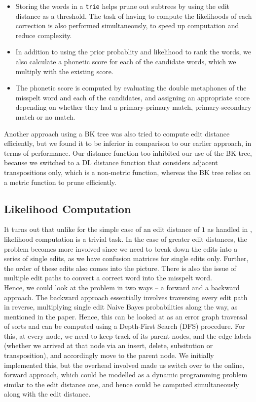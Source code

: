 \begin{itemize}
\item Storing the words in a \texttt{trie} helps prune out subtrees by using the edit distance as a threshold. The task of having to compute the likelihoods of each correction is also performed simultaneously, to speed up computation and reduce complexity.

\item In addition to using the prior probablity and likelihood to rank the words, we also calculate a phonetic score for each of the candidate words, which we multiply with the existing score.

\item The phonetic score is computed by evaluating the double metaphones of the misspelt word and each of the candidates, and assigning an appropriate score depending on whether they had a primary-primary match, primary-secondary match or no match.
\end{itemize}

Another approach using a BK tree was also tried to compute edit distance efficiently, but we found it to be inferior in comparison to our earlier approach, in terms of performance. Our distance function too inhibited our use of the BK tree, because we switched to a DL distance function that considers adjacent transpositions only, which is a non-metric function, whereas the BK tree relies on a metric function to prune efficiently.

\subsection{Likelihood Computation}
It turns out that unlike for the simple case of an edit distance of $1$ as handled in \cite{kern}, likelihood computation is a trivial task. In the case of greater edit distances, the problem becomes more involved since we need to break down the edits into a series of single edits, as we have confusion matrices for single edits only. Further, the order of these edits also comes into the picture. There is also the issue of multiple edit paths to convert a correct word into the misspelt word.\\

Hence, we could look at the problem in two ways -- a forward and a backward approach. The backward approach essentially involves traversing every edit path in reverse, multiplying single edit Naive Bayes probabilities along the way, as mentioned in the paper. Hence, this can be looked at as an error graph traversal of sorts and can be computed using a Depth-First Search (DFS) procedure. For this, at every node, we need to keep track of its parent nodes, and the edge labels (whether we arrived at that node via an insert, delete, subsitution or transposition), and accordingly move to the parent node. We initially implemented this, but the overhead involved made us switch over to the online, forward approach, which could be modelled as a dynamic programming problem similar to the edit distance one, and hence could be computed simultaneously along with the edit distance.\\

